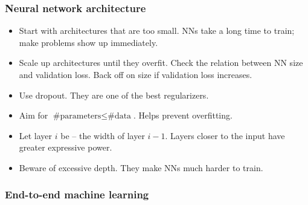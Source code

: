 \begin{frame}
    \frametitle{Neural network architecture}
    
    \hfill
    
    \hfill
    
    \hfill
    

    \begin{itemize}[<+->]
        \item \alert{Start with architectures that are too small.}
        NNs take a long time to train; make problems show up immediately.
        \item \alert{Scale up architectures until they overfit.}
        Check the relation between NN size and validation loss.
        Back off on size if validation loss increases.
        \item \alert{Use dropout.}
        They are one of the best regularizers.
        \item \alert{Aim for $\text{\# parameters} \le \text{\# data}$.}
        Helps prevent overfitting.
        \item \alert{Let layer $i$ be -- the width of layer $i - 1$.}
        Layers closer to the input have greater expressive power.
        \item \alert{Beware of excessive depth.}
        They make NNs much harder to train.
    \end{itemize}
\end{frame}

\begin{frame}
    \frametitle{End-to-end machine learning}
\end{frame}

